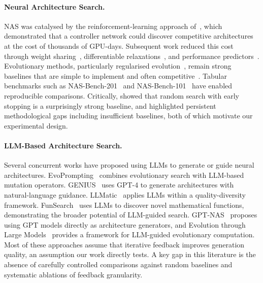 \documentclass[10pt]{article}
\begin{document}
\paragraph{Neural Architecture Search.}
NAS was catalysed by the reinforcement-learning approach
of~\citet{zoph2017nas}, which demonstrated that a controller network could
discover competitive architectures at the cost of thousands of GPU-days.
Subsequent work reduced this cost through weight
sharing~\citep{pham2018enas}, differentiable
relaxations~\citep{liu2019darts}, and performance
predictors~\citep{white2023nas}.  Evolutionary methods, particularly
regularised evolution~\citep{real2019regularized}, remain strong baselines that
are simple to implement and often
competitive~\citep{stanley2019designing,so2019evolved}.  Tabular benchmarks such
as NAS-Bench-201~\citep{dong2020nasbench201} and
NAS-Bench-101~\citep{ying2019nasbench101} have enabled reproducible
comparisons.  Critically, \citet{li2020random} showed that random search with
early stopping is a surprisingly strong baseline, and
\citet{yang2020evaluating} highlighted persistent methodological gaps
including insufficient baselines, both of which motivate our experimental design.

\paragraph{LLM-Based Architecture Search.}
Several concurrent works have proposed using LLMs to generate or guide neural
architectures.  EvoPrompting~\citep{chen2023evoprompting} combines evolutionary
search with LLM-based mutation operators.  GENIUS~\citep{zheng2023genius} uses
GPT-4 to generate architectures with natural-language guidance.
LLMatic~\citep{nasir2024llmatic} applies LLMs within a quality-diversity
framework.  FunSearch~\citep{romeraparedes2024funsearch} uses LLMs to discover
novel mathematical functions, demonstrating the broader potential of LLM-guided
search.  GPT-NAS~\citep{li2025gptnas} proposes using GPT models directly as
architecture generators, and Evolution through Large
Models~\citep{lehman2024evolution} provides a framework for LLM-guided
evolutionary computation.  Most of these approaches assume that iterative
feedback improves generation quality, an assumption our work directly tests.
A key gap in this literature is the absence of carefully controlled
comparisons against random baselines and systematic ablations of feedback
granularity.
\end{document}
